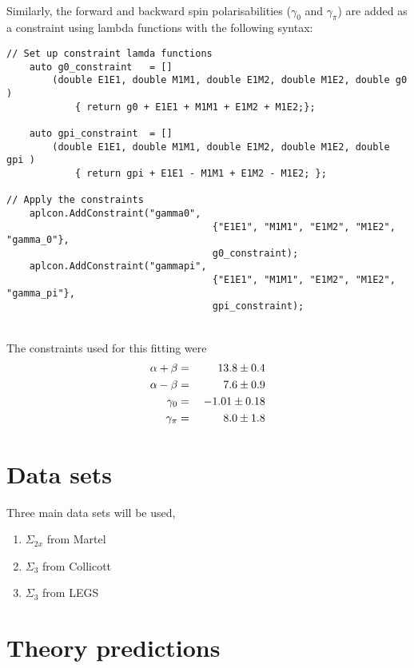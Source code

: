 \documentclass[]{article}
\begin{document}
\noindent \\Similarly, the forward and backward spin polarisabilities ($\gamma_0$ and $\gamma_{\pi}$) are added as a constraint using lambda functions with the following syntax: \\

\begin{lstlisting}
// Set up constraint lamda functions
    auto g0_constraint   = [] 
	    (double E1E1, double M1M1, double E1M2, double M1E2, double g0 )
		    { return g0 + E1E1 + M1M1 + E1M2 + M1E2;};
		    
    auto gpi_constraint  = [] 
	    (double E1E1, double M1M1, double E1M2, double M1E2, double gpi )
		    { return gpi + E1E1 - M1M1 + E1M2 - M1E2; };
    
// Apply the constraints
    aplcon.AddConstraint("gamma0", 
								    {"E1E1", "M1M1", "E1M2", "M1E2", "gamma_0"},  
								    g0_constraint);
    aplcon.AddConstraint("gammapi",
								    {"E1E1", "M1M1", "E1M2", "M1E2", "gamma_pi"}, 
								    gpi_constraint);

\end{lstlisting}

\noindent \\The constraints used for this fitting were
\begin{eqnarray}
\alpha + \beta &=& \hspace{4mm}13.8 \pm 0.4 \nonumber \\
\alpha - \beta &=& \hspace{5.5mm} 7.6 \pm 0.9 \nonumber \\
\gamma_0 &=&  \hspace{1mm}-1.01 \pm 0.18 \nonumber \\
\gamma_\pi &=& \hspace{5.5mm}8.0 \pm 1.8 \nonumber
\end{eqnarray}


\newpage
\section{Data sets}
Three main data sets will be used, 
\begin{enumerate}
	\item $\Sigma_{2x}$ from Martel
	\item $\Sigma_{3}$  from Collicott
	\item $\Sigma_{3}$  from LEGS
\end{enumerate}

\section{Theory predictions}
\end{document}
